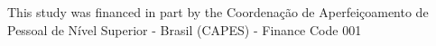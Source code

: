
\begin{agradecimentos}

\lang
{
    This study was financed in part by the Coordenação de Aperfeiçoamento de Pessoal de Nível Superior - Brasil (CAPES) - Finance Code 001
}
{
    
}

\end{agradecimentos}


%
%
%
